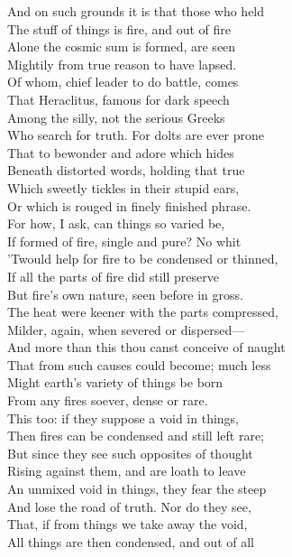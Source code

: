 And on such grounds it is that those who held\\
The stuff of things is fire, and out of fire\\
Alone the cosmic sum is formed, are seen\\
Mightily from true reason to have lapsed.\\
Of whom, chief leader to do battle, comes\\
That Heraclitus, famous for dark speech\\
Among the silly, not the serious Greeks\\
Who search for truth. For dolts are ever prone\\
That to bewonder and adore which hides\\
Beneath distorted words, holding that true\\
Which sweetly tickles in their stupid ears,\\
Or which is rouged in finely finished phrase.\\
For how, I ask, can things so varied be,\\
If formed of fire, single and pure? No whit\\
'Twould help for fire to be condensed or thinned,\\
If all the parts of fire did still preserve\\
But fire's own nature, seen before in gross.\\
The heat were keener with the parts compressed,\\
Milder, again, when severed or dispersed—\\
And more than this thou canst conceive of naught\\
That from such causes could become; much less\\
Might earth's variety of things be born\\
From any fires soever, dense or rare.\\
This too: if they suppose a void in things,\\
Then fires can be condensed and still left rare;\\
But since they see such opposites of thought\\
Rising against them, and are loath to leave\\
An unmixed void in things, they fear the steep\\
And lose the road of truth. Nor do they see,\\
That, if from things we take away the void,\\
All things are then condensed, and out of all\\
